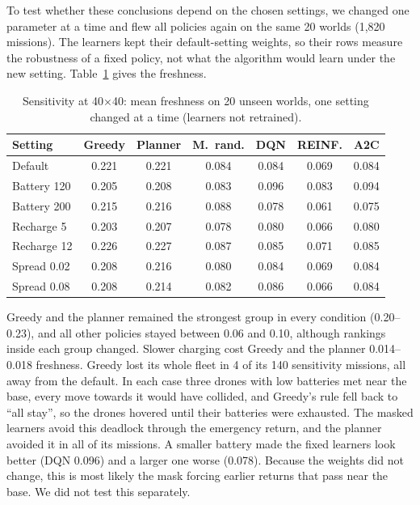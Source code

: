 To test whether these conclusions depend on the chosen settings, we changed one parameter at a
time and flew all policies again on the same 20 worlds (1{,}820 missions). The learners kept
their default-setting weights, so their rows measure the robustness of a fixed policy, not
what the algorithm would learn under the new setting. Table~\ref{tab:sens} gives the
freshness.

\begin{table}[!t]
\centering
\caption{Sensitivity at 40$\times$40: mean freshness on 20 unseen worlds, one setting
changed at a time (learners not retrained).}
\label{tab:sens}
\scriptsize
\setlength{\tabcolsep}{3pt}
\begin{tabular}{lcccccc}
\toprule
Setting & Greedy & Planner & M.\ rand. & DQN & REINF. & A2C \\
\midrule
Default & 0.221 & 0.221 & 0.084 & 0.084 & 0.069 & 0.084 \\
Battery 120 & 0.205 & 0.208 & 0.083 & 0.096 & 0.083 & 0.094 \\
Battery 200 & 0.215 & 0.216 & 0.088 & 0.078 & 0.061 & 0.075 \\
Recharge 5 & 0.203 & 0.207 & 0.078 & 0.080 & 0.066 & 0.080 \\
Recharge 12 & 0.226 & 0.227 & 0.087 & 0.085 & 0.071 & 0.085 \\
Spread 0.02 & 0.208 & 0.216 & 0.080 & 0.084 & 0.069 & 0.084 \\
Spread 0.08 & 0.208 & 0.214 & 0.082 & 0.086 & 0.066 & 0.084 \\
\bottomrule
\end{tabular}
\end{table}

Greedy and the planner remained the strongest group in every condition (0.20--0.23), and all
other policies stayed between 0.06 and 0.10, although rankings inside each group changed.
Slower charging cost Greedy and the planner 0.014--0.018 freshness. Greedy lost its whole
fleet in 4 of its 140 sensitivity missions, all away from the default. In each case three drones with low batteries
met near the base, every move towards it would have collided, and Greedy's rule fell back to
``all stay'', so the drones hovered until their batteries were exhausted. The masked learners
avoid this deadlock through the emergency return, and the planner avoided it in all of its
missions. A smaller battery made the fixed learners look better (DQN 0.096) and a larger one
worse (0.078). Because the weights did not change, this is most likely the mask forcing
earlier returns that pass near the base. We did not test this separately.

